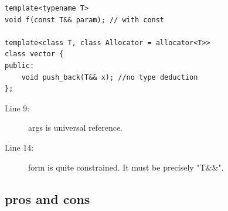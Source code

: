 \documentclass[a4paper,11pt,twoside]{book}
\begin{document}
\begin{itemize}
\begin{lstlisting}
template<typename T>
void f(const T&& param); // with const

template<class T, class Allocator = allocator<T>>
class vector { 
public:
	void push_back(T&& x); //no type deduction
};
\end{lstlisting}
\begin{description}
	\item[Line 9:] args is universal reference.
	\item[Line 14:] form is quite constrained. It must be precisely "T\&\&".
\end{description}


\end{itemize}

\subsection{pros and cons}
\end{document}
